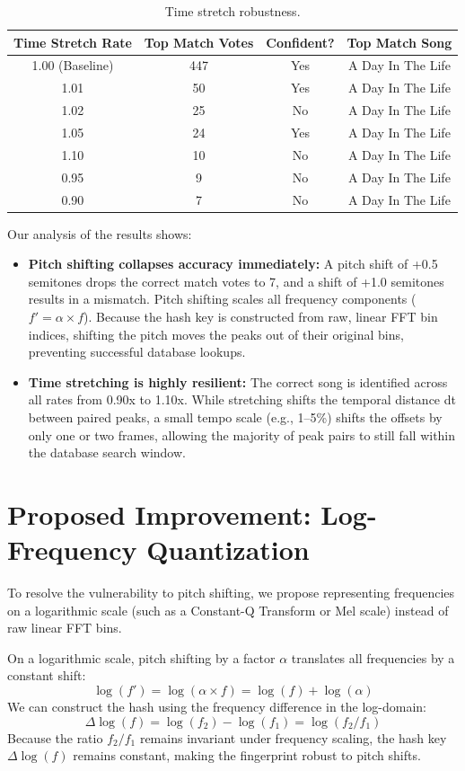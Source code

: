 \documentclass[11pt,a4paper]{article}
\begin{document}
\begin{table}[H]
\centering
\caption{Time stretch robustness.}
\label{tab:time_stretch}
\begin{tabular}{cccc}
\toprule
\textbf{Time Stretch Rate} & \textbf{Top Match Votes} & \textbf{Confident?} & \textbf{Top Match Song} \\
\midrule
1.00 (Baseline) & 447 & Yes & A Day In The Life \\
1.01 & 50 & Yes & A Day In The Life \\
1.02 & 25 & No & A Day In The Life \\
1.05 & 24 & Yes & A Day In The Life \\
1.10 & 10 & No & A Day In The Life \\
0.95 & 9 & No & A Day In The Life \\
0.90 & 7 & No & A Day In The Life \\
\bottomrule
\end{tabular}
\end{table}

Our analysis of the results shows:
\begin{itemize}
    \item \textbf{Pitch shifting collapses accuracy immediately:} A pitch shift of +0.5 semitones drops the correct match votes to 7, and a shift of +1.0 semitones results in a mismatch. Pitch shifting scales all frequency components ($f' = \alpha \times f$). Because the hash key is constructed from raw, linear FFT bin indices, shifting the pitch moves the peaks out of their original bins, preventing successful database lookups.
    \item \textbf{Time stretching is highly resilient:} The correct song is identified across all rates from 0.90x to 1.10x. While stretching shifts the temporal distance dt between paired peaks, a small tempo scale (e.g., 1--5\%) shifts the offsets by only one or two frames, allowing the majority of peak pairs to still fall within the database search window.
\end{itemize}

\section{Proposed Improvement: Log-Frequency Quantization}
To resolve the vulnerability to pitch shifting, we propose representing frequencies on a logarithmic scale (such as a Constant-Q Transform or Mel scale) instead of raw linear FFT bins.

On a logarithmic scale, pitch shifting by a factor $\alpha$ translates all frequencies by a constant shift:
\begin{equation}
\log(f') = \log(\alpha \times f) = \log(f) + \log(\alpha)
\end{equation}
We can construct the hash using the frequency difference in the log-domain:
\begin{equation}
\Delta \log(f) = \log(f_2) - \log(f_1) = \log(f_2 / f_1)
\end{equation}
Because the ratio $f_2 / f_1$ remains invariant under frequency scaling, the hash key $\Delta \log(f)$ remains constant, making the fingerprint robust to pitch shifts.
\end{document}
